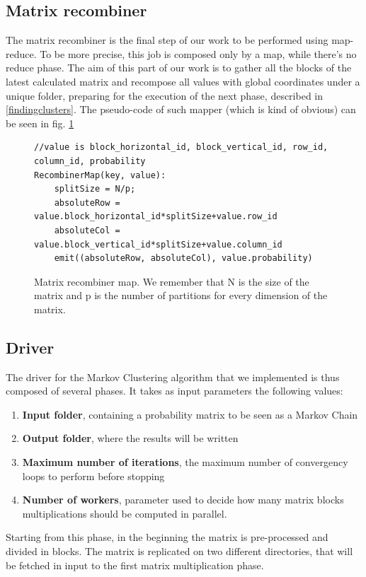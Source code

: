 \subsection{Matrix recombiner}
\label{recombiner}
The matrix recombiner is the final step of our work to be performed using map-reduce. To be more precise, this job is composed only
by a map, while there's no reduce phase. The aim of this part of our work is to gather all the blocks of the latest calculated matrix and recompose all values with global coordinates under a unique folder, preparing for the execution of the next phase, described in \ref{findingclusters}. 
The pseudo-code of such mapper (which is kind of obvious) can be seen in fig. \ref{fig:recombiner}
\begin{figure}[H]
\begin{verbatim}
//value is block_horizontal_id, block_vertical_id, row_id, column_id, probability
RecombinerMap(key, value):
    splitSize = N/p;
    absoluteRow = value.block_horizontal_id*splitSize+value.row_id
    absoluteCol = value.block_vertical_id*splitSize+value.column_id
    emit((absoluteRow, absoluteCol), value.probability)
\end{verbatim}
\caption{Matrix recombiner map. We remember that N is the size of the matrix and p is the number of partitions for every dimension of the matrix.}
\label{fig:recombiner}
\end{figure}

\subsection{Driver}
The driver for the Markov Clustering algorithm that we implemented is thus composed of several phases.
It takes as input parameters the following values:
\begin{enumerate}
\item \textbf{Input folder}, containing a probability matrix to be seen as a Markov Chain
\item \textbf{Output folder}, where the results will be written
\item \textbf{Maximum number of iterations}, the maximum number of convergency loops to perform before stopping
\item \textbf{Number of workers}, parameter used to decide how many matrix blocks multiplications should be computed in parallel.
\end{enumerate}
Starting from this phase, in the beginning the matrix is pre-processed and divided in blocks. The matrix is replicated on two different directories, that will be fetched in input to the first matrix multiplication phase.

